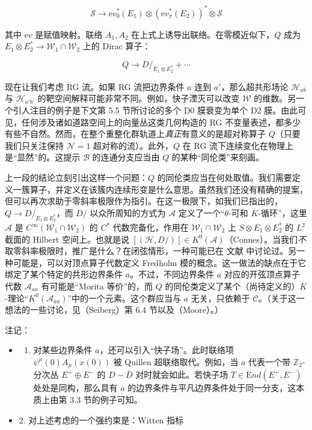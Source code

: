 \documentclass[11pt,a4paper]{ctexart}
\begin{document}
\[{\mathcal S } \to {\mathrm ev}_0^*(E_1)\otimes ({\mathrm ev}_\pi^*(E_2))^* \otimes {\mathcal S }\]

其中 \({\mathrm ev}\) 是赋值映射。联络 \(A_1,A_2\) 在上式上诱导出联络。在零模近似下，\(Q\) 成为 \(E_1 \otimes E_2^* \to {\mathcal W}_1 \cap {\mathcal W}_2\) 上的 Dirac 算子：

\[Q \to D/_{E_1 \otimes E_2^*} + \cdots\]

现在让我们考虑 RG 流。如果 RG 流把边界条件 \(a\) 连到 \(a'\)，那么超共形场论 \({\mathcal H}_{ab}\) 与 \({\mathcal H}_{a'b'}\) 的靶空间解释可能非常不同。例如，快子湮灭可以改变 \({\mathcal W}\) 的维数。另一个引人注目的例子是下文第 5.5 节所讨论的多个 D0 膜衰变为单个 D2 膜。由此可见，任何涉及诸如道路空间上的向量丛这类几何构造的 RG 不变量表述，都多少有些不自然。然而，在整个重整化群轨道上\emph{真正}有意义的是超对称算子 \(Q\)（只要我们只关注保持 \({\mathcal N}=1\) 超对称的流）。此外，\(Q\) 在 RG 流下连续变化在物理上是``显然''的。这提示 \({\mathcal B}\) 的连通分支应当由 \(Q\) 的某种``同伦类''来刻画。

上一段的结论立刻引出这样一个问题：\(Q\) 的同伦类应当在何处取值。我们需要定义一簇算子，并定义在该簇内连续形变是什么意思。虽然我们还没有精确的提案，但可以再次求助于零斜率极限作为指引。在这一极限下，如我们已指出的，\(Q \to D/_{E_1 \otimes E_2^*}\)，而 \(D/\) 以众所周知的方式为 \({\mathcal A}\) 定义了一个``\(\theta\)-可和 \(K\)-循环''，这里 \({\mathcal A}\) 是 \(C^{\infty}({\mathcal W}_1 \cap {\mathcal W}_2)\) 的 \(C^*\) 代数完备化，作用在 \({\mathcal W}_1 \cap {\mathcal W}_2\) 上 \(S\otimes E_1 \otimes E_2^*\) 的 \(L^2\) 截面的 Hilbert 空间上。也就是说 \([({\mathcal H}, D/)] \in K^0({\mathcal A})\)（Connes）。当我们\emph{不}取零斜率极限时，推广是什么？在闭弦情形，一种可能已在 文献 中讨论过。另一种可能是，可以对顶点算子代数定义 Fredholm 模的概念。这一做法的缺点在于它绑定了某个特定的共形边界条件 \(a\)。不过，不同边界条件 \(a\) 对应的开弦顶点算子代数 \({\mathcal A}_{aa}\) 有可能是``Morita 等价''的，而 \(Q\) 的同伦类定义了某个（尚待定义的）\(K\)-理论``\(K^0({\mathcal A}_{aa})\)''中的一个元素。这个群应当与 \(a\) 无关，只依赖于 \({\mathcal C}\)。（关于这一想法的一些讨论，见（Seiberg）第 6.4 节以及（Moore）。）

注记：

\begin{itemize}
\tightlist
\item
  \begin{enumerate}
  \def\labelenumi{\arabic{enumi}.}
  \tightlist
  \item
    对某些边界条件 \(a\)，还可以引入``快子场''。此时联络项 \(\psi^\mu(0) A_{\mu}(x(0))\) 被 Quillen 超联络取代。例如，当 \(a\) 代表一个带 \(\mathbb{Z}_2\)-分次丛 \(E^+ \oplus E^-\) 的 \(D-\bar D\) 对时就会如此。若快子场 \(T \in {\mathrm End}(E^+,E^-)\) 处处是同构，那么具有 \(a\) 的边界条件与平凡边界条件处于同一分支，这本质上由第 3.3 节的例子可知。
  \end{enumerate}
\item
  2. 对上述考虑的一个强约束是：Witten 指标
\end{itemize}
\end{document}
